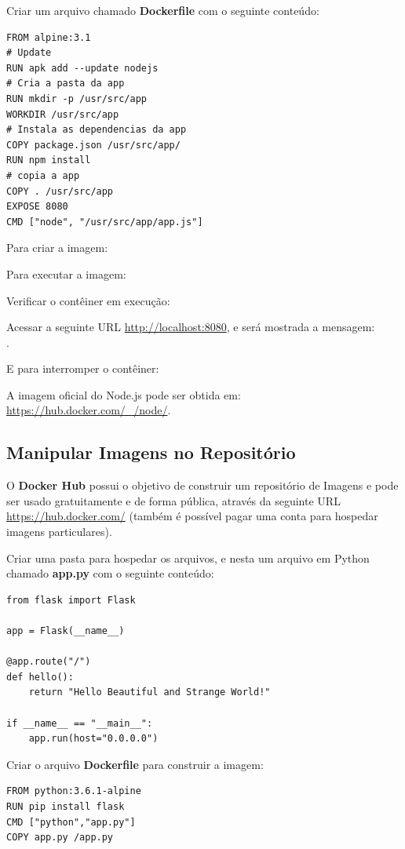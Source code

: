 \documentclass[a4paper,11pt]{article}
\begin{document}
Criar um arquivo chamado \textbf{Dockerfile} com o seguinte conteúdo:
\begin{lstlisting}
FROM alpine:3.1
# Update
RUN apk add --update nodejs
# Cria a pasta da app
RUN mkdir -p /usr/src/app
WORKDIR /usr/src/app
# Instala as dependencias da app
COPY package.json /usr/src/app/
RUN npm install
# copia a app
COPY . /usr/src/app
EXPOSE 8080
CMD ["node", "/usr/src/app/app.js"]
\end{lstlisting}

Para criar a imagem: \\

Para executar a imagem: \\

Verificar o contêiner em execução: \\

Acessar a seguinte URL \url{http://localhost:8080}, e será mostrada a mensagem: \\ .

E para interromper o contêiner: \\

A imagem oficial do Node.js pode ser obtida em: 
\url{https://hub.docker.com/_/node/}.

\subsection{Manipular Imagens no Repositório}
O \textbf{Docker Hub} possui o objetivo de construir um repositório de Imagens e pode ser usado gratuitamente e de forma pública, através da seguinte URL \url{https://hub.docker.com/} (também é possível pagar uma conta para hospedar imagens particulares).

Criar uma pasta para hospedar os arquivos, e nesta um arquivo em Python chamado \textbf{app.py} com o seguinte conteúdo:
\begin{lstlisting}
from flask import Flask

app = Flask(__name__)

@app.route("/")
def hello():
	return "Hello Beautiful and Strange World!"

if __name__ == "__main__":
	app.run(host="0.0.0.0")
\end{lstlisting}

Criar o arquivo \textbf{Dockerfile} para construir a imagem:
\begin{lstlisting}
FROM python:3.6.1-alpine
RUN pip install flask
CMD ["python","app.py"]
COPY app.py /app.py
\end{lstlisting}
\end{document}
